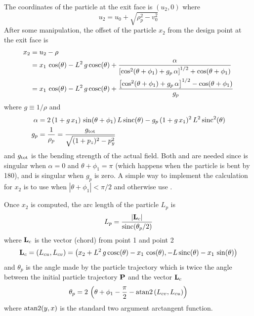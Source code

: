 The coordinates of the particle at the exit face is $(u_2, 0)$ where
\begin{equation}
  u_2 = u_0 + \sqrt{\rho_p^2 - v_0^2}
\end{equation}
After some manipulation, the offset of the particle $x_2$ from the design point at the exit face is
\begin{align}
  x_2 &= u_2 - \rho \nonumber \\
  &= x_1 \, \cos(\theta) - L^2 \, g \, \text{cosc}(\theta) + 
    \frac{\alpha}{\left[ \cos^2(\theta + \phi_1) + g_p \, \alpha \right]^{1/2} + \cos(\theta + \phi_1)} 
    \label{xctlg1} \\
  &= x_1 \, \cos(\theta) - L^2 \, g \, \text{cosc}(\theta) + 
    \frac{\left[ \cos^2(\theta + \phi_1) + g_p \, \alpha \right]^{1/2} - \cos(\theta + \phi_1)}{g_p}
    \label{xctlg2}
\end{align}
where $g \equiv 1/\rho$  and 
\begin{align}
  \alpha &= 2 \, (1 + g \, x_1) \, \sin(\theta + \phi_1) \, L \, \text{sinc}(\theta) - 
        g_p \, (1 + g \, x_1)^2 \, L^2 \, \text{sinc}^2(\theta) \\
  g_p &= \frac{1}{\rho_p} = \frac{g_{\text{tot}}}{\sqrt{(1 + p_z)^2 - p_y^2}} \label{g1rg}
\end{align}
and $g_{\text{tot}}$ is the bending strength of the actual field. Both  and  are
needed since  is singular when $\alpha = 0$ and $\theta + \phi_1 = \pi$ (which happens
when the particle is bent by 180\Deg), and  is singular when $g_p$ is zero. A simple way
to implement the calculation for $x_2$ is to use  when $|\theta + \phi_1| < \pi/2$ and
otherwise use .

Once $x_2$ is computed, the arc length of the particle $L_p$ is 
\begin{equation}
  L_p = \frac{|{\bf L}_c|}{\text{sinc}(\theta_p/2)}
\end{equation}
where ${\bf L}_c$ is the vector (chord) from point 1 and point 2
\begin{equation}
  {\bf L}_c = (L_{cu}, L_{cv}) =
  \left( x_2 + L^2 \, g \, \text{cosc}(\theta) - x_1 \, \cos(\theta),
                  -L \, \text{sinc}(\theta) - x_1 \, \sin(\theta) \right) 
\end{equation}
and $\theta_p$ is the angle made by the particle trajectory which is twice the angle between
the initial particle trajectory ${\bf P}$ and the vector ${\bf L}_c$
\begin{equation}
  \theta_p = 2 \, \left( \theta + \phi_1 - \frac{\pi}{2} - \text{atan2} \left( L_{cv}, L_{cu} \right) \right)
\end{equation}
where $\text{atan2}(y, x)$ is the standard two argument arctangent function.

